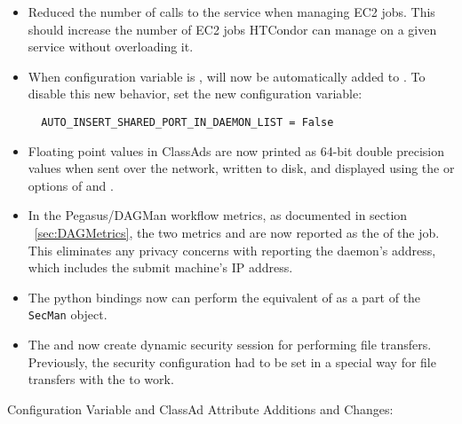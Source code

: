 \begin{itemize}

\item Reduced the number of calls to the service when managing EC2 jobs. This
should increase the number of EC2 jobs HTCondor can manage on a given service
without overloading it.

\item When configuration variable  is ,
 will now be automatically added to .
To disable this new behavior, set the new configuration variable:
\begin{verbatim}
  AUTO_INSERT_SHARED_PORT_IN_DAEMON_LIST = False
\end{verbatim}

\item Floating point values in ClassAds are now printed as 64-bit
double precision values when sent over the network, written to disk, and
displayed using the  or  options of
 and .

\item In the Pegasus/DAGMan workflow metrics,
as documented in section ~\ref{sec:DAGMetrics},
the two metrics
 and  are now reported
as the  of the  job.  This
eliminates any privacy concerns with reporting the  
daemon's address,
which includes the submit machine's IP address.

\item The python bindings now can perform the equivalent of 
 as a part of the \texttt{SecMan} object.

\item The  and  now create
dynamic security session for performing file transfers.
Previously, the security configuration had to be set in a special
way for file transfers with the  to work.

\end{itemize}

\noindent Configuration Variable and ClassAd Attribute Additions and Changes:

